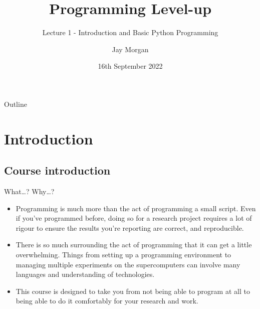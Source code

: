 \documentclass[10pt]{beamer}
\author{Jay Morgan}
\date{16th September 2022}
\title{Programming Level-up}
\subtitle{Lecture 1 - Introduction and Basic Python Programming}
\begin{document}
\maketitle
\begin{frame}{Outline}
\tableofcontents
\end{frame}


\section{Introduction}
\label{sec:orgf298041}

\subsection{Course introduction}
\label{sec:org39f9319}

\begin{frame}[label={sec:org6249571}]{What\ldots{}? Why\ldots{}?}
\begin{itemize}
\item Programming is much more than the act of programming a small script. Even if you've
programmed before, doing so for a research project requires a lot of rigour to
ensure the results you're reporting are correct, and reproducible.
\item There is so much surrounding the act of programming that it can get a little
overwhelming. Things from setting up a programming environment to managing multiple
experiments on the supercomputers can involve many languages and understanding of
technologies.
\item This course is designed to take you from not being able to program at all to being
able to do it comfortably for your research and work.
\end{itemize}
\end{frame}
\end{document}
